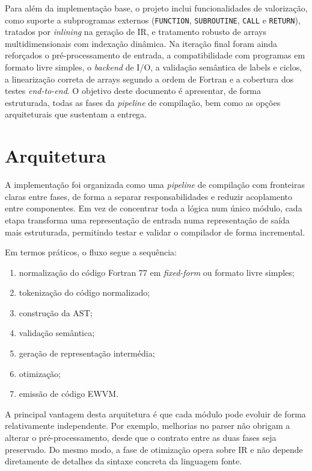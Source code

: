 \documentclass{article}
\begin{document}
Para além da implementação base, o projeto inclui funcionalidades de valorização, como suporte
a subprogramas externos (\texttt{FUNCTION}, \texttt{SUBROUTINE}, \texttt{CALL} e
\texttt{RETURN}), tratados por \textit{inlining} na geração de IR, e tratamento robusto de
arrays multidimensionais com indexação dinâmica. Na iteração final foram ainda reforçados o
pré-processamento de entrada, a compatibilidade com programas em formato livre simples, o
\textit{backend} de I/O, a validação semântica de labels e ciclos, a linearização correta de
arrays segundo a ordem de Fortran e a cobertura dos testes \textit{end-to-end}. O objetivo
deste documento é apresentar, de forma estruturada, todas as fases da \textit{pipeline} de
compilação, bem como as opções arquiteturais que sustentam a entrega.

\section{Arquitetura}

A implementação foi organizada como uma \textit{pipeline} de compilação com fronteiras claras entre fases, de forma a separar responsabilidades e reduzir acoplamento entre componentes. Em vez de concentrar toda a lógica num único módulo, cada etapa transforma uma representação de entrada numa representação de saída mais estruturada, permitindo testar e validar o compilador de forma incremental.

Em termos práticos, o fluxo segue a sequência:
\begin{enumerate}
\item normalização do código Fortran 77 em \textit{fixed-form} ou formato livre simples;
\item tokenização do código normalizado;
\item construção da AST;
\item validação semântica;
\item geração de representação intermédia;
\item otimização;
\item emissão de código EWVM.
\end{enumerate}

A principal vantagem desta arquitetura é que cada módulo pode evoluir de forma relativamente independente. Por exemplo, melhorias no parser não obrigam a alterar o pré-processamento, desde que o contrato entre as duas fases seja preservado. Do mesmo modo, a fase de otimização opera sobre IR e não depende diretamente de detalhes da sintaxe concreta da linguagem fonte.
\end{document}
